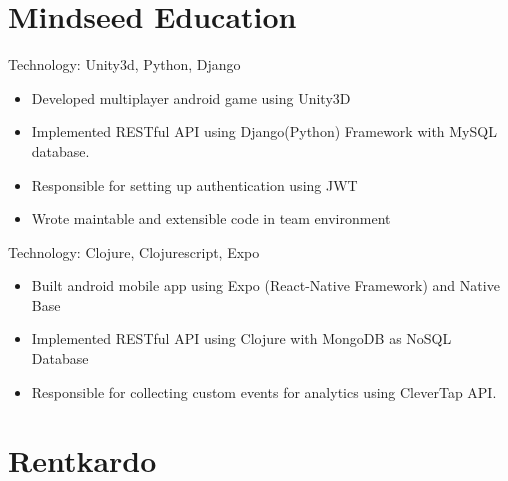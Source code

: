 \documentclass[11pt,a4paper,sans]{moderncv} %
\begin{document}
\section{Mindseed Education}

{Technology: Unity3d, Python, Django}{}{}
{\begin{itemize}
\item Developed multiplayer android game using Unity3D
\item Implemented RESTful API using Django(Python) Framework with MySQL database.
\item Responsible for setting up authentication using JWT
\item Wrote maintable and extensible code in team environment
\end{itemize}}

{Technology: Clojure, Clojurescript, Expo}{}{}
{\begin{itemize}
\item Built android mobile app using Expo (React-Native Framework) and Native Base
\item Implemented RESTful API using Clojure with MongoDB as NoSQL Database
\item Responsible for collecting custom events for analytics using CleverTap API.
\end{itemize}}



\section{Rentkardo}

\end{document}
